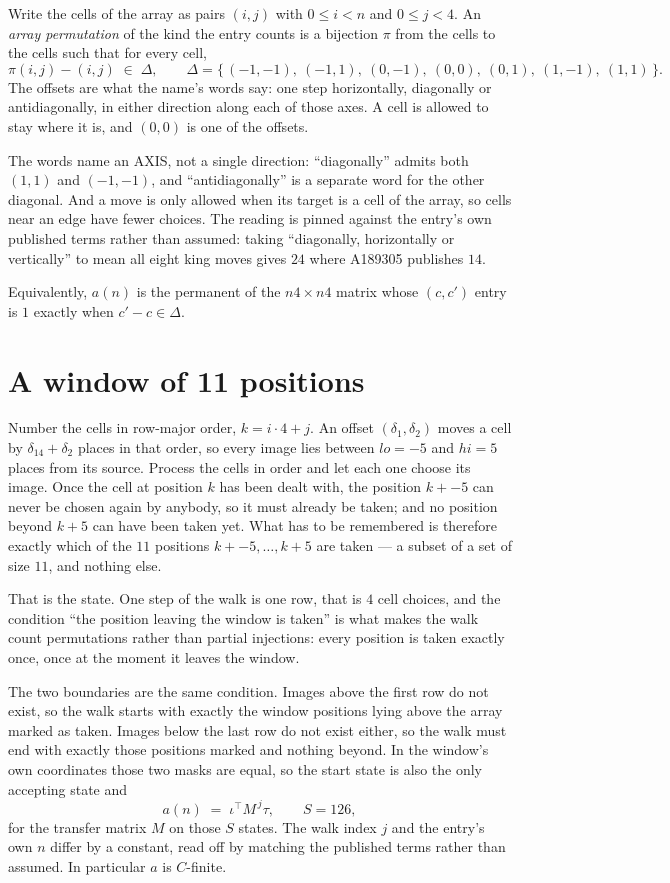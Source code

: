 \documentclass[11pt,a4paper]{article}
\theoremstyle{plain}
\theoremstyle{definition}
\begin{document}
Write the cells of the array as pairs $(i,j)$ with $0\le i<n$ and $0\le j<4$. An
\emph{array permutation} of the kind the entry counts is a bijection $\pi$ from the cells to
the cells such that for every cell,
\[
\pi(i,j)-(i,j)\;\in\;\Delta,\qquad
\Delta=\{\,(-1,-1),\ (-1,1),\ (0,-1),\ (0,0),\ (0,1),\ (1,-1),\ (1,1)\,\}.
\]
The offsets are what the name's words say: one step horizontally, diagonally or antidiagonally, in either direction along each of those axes. A cell is allowed to stay where it is, and $(0,0)$ is one of the offsets.

The words name an AXIS, not a single direction: ``diagonally'' admits
both $(1,1)$ and $(-1,-1)$, and ``antidiagonally'' is a separate word for the other diagonal.
And a move is only allowed when its target is a cell of the array, so cells near an
edge have fewer choices. The reading is pinned against the entry's own published terms rather
than assumed: taking ``diagonally, horizontally or vertically'' to mean all eight king moves
gives $24$ where A189305 publishes $14$.

Equivalently, $a(n)$ is the permanent of the $n4\times n4$ matrix whose $(c,c')$ entry is
$1$ exactly when $c'-c\in\Delta$.

\section{A window of 11 positions}

Number the cells in row-major order, $k=i\cdot4+j$. An offset $(\delta_1,\delta_2)$ moves a
cell by $\delta_14+\delta_2$ places in that order, so every image lies between $lo=-5$ and
$hi=5$ places from its source. Process the cells in order and let each one choose its image.
Once the cell at position $k$ has been dealt with, the position $k+-5$ can never be chosen
again by anybody, so it must already be taken; and no position beyond $k+5$ can have been
taken yet. What has to be remembered is therefore exactly which of the $11$ positions
$k+-5,\dots,k+5$ are taken --- a subset of a set of size $11$, and nothing else.

That is the state. One step of the walk is one row, that is $4$ cell choices, and the
condition ``the position leaving the window is taken'' is what makes the walk count permutations
rather than partial injections: every position is taken exactly once, once at the moment it
leaves the window.

The two boundaries are the same condition. Images above the first row do not exist, so the walk
starts with exactly the window positions lying above the array marked as taken. Images below the
last row do not exist either, so the walk must end with exactly those positions marked and
nothing beyond. In the window's own coordinates those two masks are equal, so the start state is
also the only accepting state and
\[
a(n)\;=\;\iota^{\!\top}M^{\,j}\tau ,\qquad S=126,
\]
for the transfer matrix $M$ on those $S$ states. The walk index $j$ and the entry's own $n$
differ by a constant, read off by matching the published terms rather than assumed. In
particular $a$ is $C$-finite.
\end{document}
